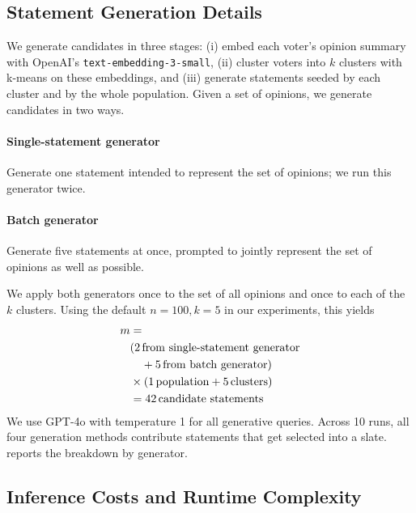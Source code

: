 \documentclass[letterpaper]{article} %
\begin{document}
\subsection{Statement Generation Details}
\label{sec:statement-generation}

We generate candidates in three stages: (i) embed each voter's opinion summary with OpenAI's \texttt{text-embedding-3-small}, (ii) cluster voters into \(k\) clusters with k-means on these embeddings, and (iii) generate statements seeded by each cluster and by the whole population.
Given a set of opinions, we generate candidates in two ways.

\paragraph{Single-statement generator}
Generate one statement intended to represent the set of opinions; we run this generator twice.

\paragraph{Batch generator}
Generate five statements at once, prompted to jointly represent the set of opinions as well as possible.

We apply both generators once to the set of all opinions and once to each of the \(k\) clusters.
Using the default \(n=100, k=5\) in our experiments, this yields
\[
\begin{aligned}
m&= \\
&(2\,\text{from single\text{-}statement generator} \\
&\quad + 5\,\text{from batch generator}) \\
&\times (1\,\text{population} + 5\,\text{clusters}) \\
&= 42\,\text{candidate statements}
\end{aligned}
\]
We use GPT-4o with temperature 1 for all generative queries.
Across 10 runs, all four generation methods contribute statements that get selected into a slate.
 reports the breakdown by generator.

\subsection{Inference Costs and Runtime Complexity}
\label{sec:inference-costs}
\end{document}
